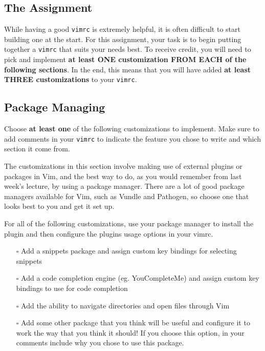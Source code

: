 \documentclass{article}
\begin{document}
\subsection*{The Assignment}
While having a good \texttt{vimrc} is extremely helpful, it is often difficult to start building one at the start. For
this assignment, your task is to begin putting together a \texttt{vimrc} that suits your needs best. To receive credit,
you will need to pick and implement \textbf{at least ONE customization FROM EACH of the following sections}. In the end,
this means that you will have added \textbf{at least THREE customizations} to your \texttt{vimrc}.

\pagebreak

\subsection{Package Managing}
Choose \textbf{at least one} of the following customizations to implement. Make sure to add comments in your
\texttt{vimrc} to indicate the feature you chose to write and which section it come from.

The customizations in this section involve making use of external plugins or packages in Vim, and the best way to do, as
you would remember from last week's lecture, by using a package manager. There are a lot of good package managers
available for Vim, such as Vundle and Pathogen, so choose one that looks best to you and get it set up. 

For all of the following
customizations, use your package manager to install the plugin and then configure the plugins usage options in your
vimrc.

\begin{itemize}
  \item[$\square$] Add a snippets package and assign custom key bindings for selecting snippets
  \item[$\square$] Add a code completion engine (eg. YouCompleteMe) and assign custom key bindings to use for code
      completion
  \item[$\square$] Add the ability to navigate directories and open files through Vim
  \item[$\square$] Add some other package that you think will be useful and configure it to work the way that you think
      it should! If you choose this option, in your comments include why you chose to use this package.
\end{itemize}
\end{document}
